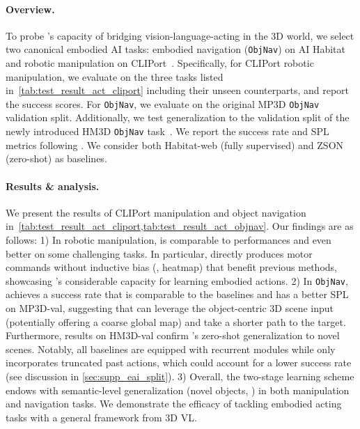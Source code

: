 \documentclass{article}
\begin{document}
\paragraph{Overview.} To probe \agent's capacity of bridging vision-language-acting in the 3D world, we select two canonical embodied AI tasks: embodied navigation (\texttt{ObjNav}) on AI Habitat~\citep{ramrakhya2022habitat} and robotic manipulation on CLIPort~\citep{cliport}.
Specifically, for CLIPort robotic manipulation, we evaluate \agent on the three tasks listed in~\cref{tab:test_result_act_cliport} including their unseen counterparts, and report the success scores. For \texttt{ObjNav}, 
we evaluate \agent on the original MP3D \texttt{ObjNav} validation split. Additionally, we test generalization to the validation split of the newly introduced HM3D \texttt{ObjNav} task~\citep{ramakrishnan2021habitat}. We report the success rate and SPL metrics following \citet{ramrakhya2022habitat}. We consider both Habitat-web \citep{ramrakhya2022habitat} (fully supervised) and ZSON \citep{majumdar2022zson} (zero-shot) as baselines.

\paragraph{Results \& analysis.} We present the results of CLIPort manipulation and object navigation in~\cref{tab:test_result_act_cliport,tab:test_result_act_objnav}. Our findings are as follows: 1) In robotic manipulation, \agent is comparable to \sota performances and even better on some challenging {\color{myred}{unseen}} tasks. In particular, \agent directly produces motor commands without inductive bias (\eg, heatmap) that benefit previous methods, showcasing \agent's considerable capacity for learning embodied actions. 2) In \texttt{ObjNav}, \agent achieves a success rate that is comparable to the baselines and has a better SPL on MP3D-val, suggesting that \agent can leverage the object-centric 3D scene input (potentially offering a coarse global map) and take a shorter path to the target. Furthermore, results on HM3D-val confirm \agent's zero-shot generalization to novel scenes. Notably, all baselines are equipped with recurrent modules while \agent only incorporates truncated past actions, which could account for a lower success rate (see discussion in \cref{sec:supp_eai_split}). 3) Overall, the two-stage learning scheme endows \agent with semantic-level generalization (novel objects, \etc) in both manipulation and navigation tasks. We demonstrate the efficacy of tackling embodied acting tasks with a general framework from 3D VL.
\end{document}

